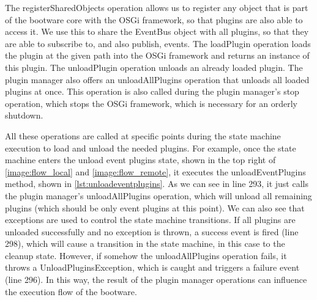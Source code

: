 \vspace*{\baselineskip}

The registerSharedObjects operation allows us to register any object that is part of the bootware core with the OSGi framework, so that plugins are also able to access it.
We use this to share the EventBus object with all plugins, so that they are able to subscribe to, and also publish, events.
The loadPlugin operation loads the plugin at the given path into the OSGi framework and returns an instance of this plugin.
The unloadPlugin operation unloads an already loaded plugin.
The plugin manager also offers an unloadAllPlugins operation that unloads all loaded plugins at once.
This operation is also called during the plugin manager's stop operation, which stops the OSGi framework, which is necessary for an orderly shutdown.

All these operations are called at specific points during the state machine execution to load and unload the needed plugins.
For example, once the state machine enters the unload event plugins state, shown in the top right of \autoref{image:flow_local} and \autoref{image:flow_remote}, it executes the unloadEventPlugins method, shown in \autoref{lst:unloadeventplugins}.
As we can see in line 293, it just calls the plugin manager's unloadAllPlugins operation, which will unload all remaining plugins (which should be only event plugins at this point).
We can also see that exceptions are used to control the state machine transitions.
If all plugins are unloaded successfully and no exception is thrown, a success event is fired (line 298), which will cause a transition in the state machine, in this case to the cleanup state.
However, if somehow the unloadAllPlugins operation fails, it throws a UnloadPluginsException, which is caught and triggers a failure event (line 296).
In this way, the result of the plugin manager operations can influence the execution flow of the bootware.

\vspace*{\baselineskip}
